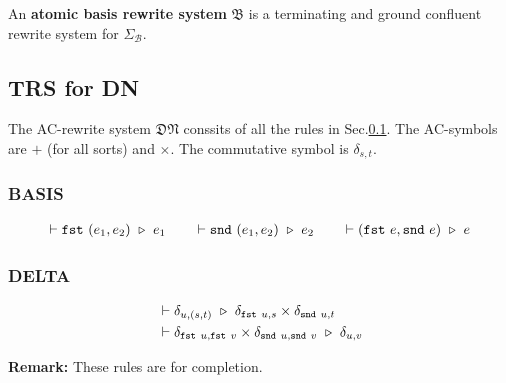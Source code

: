 \begin{definition}
  An \textbf{atomic basis rewrite system} $\mathfrak{B}$ is a terminating and ground confluent rewrite system for $\Sigma_\mathcal{B}$.
\end{definition}


\subsection{TRS for DN}
\label{sec: typed_dirac_rules}

\begin{definition} 
  The AC-rewrite system $\mathfrak{DN}$ conssits of all the rules in Sec.\ref{sec: typed_dirac_rules}.
  The AC-symbols are $+$ (for all sorts) and $\times$. The commutative symbol is $\delta_{s, t}$.
\end{definition}

\subsubsection*{\textsf{BASIS}}
\begin{align*}
    \vdash \texttt{fst}\ (e_1, e_2) \ \triangleright\  e_1
    \qquad
    \vdash \texttt{snd}\ (e_1, e_2) \ \triangleright\  e_2
    \qquad
    \vdash (\texttt{fst}\ e, \texttt{snd}\ e)\ \triangleright\  e
\end{align*}

\subsubsection*{\textsf{DELTA}}
\begin{align*}
  & \vdash \delta_{u, (s, t)} \ \triangleright\  \delta_{\texttt{fst}\ u, s} \times \delta_{\texttt{snd}\ u, t} \\
  & \vdash \delta_{\texttt{fst}\ u, \texttt{fst}\ v}\times\delta_{\texttt{snd}\ u, \texttt{snd}\ v} \ \triangleright\  \delta_{u, v}
\end{align*}

\textbf{Remark: } These rules are for completion.


